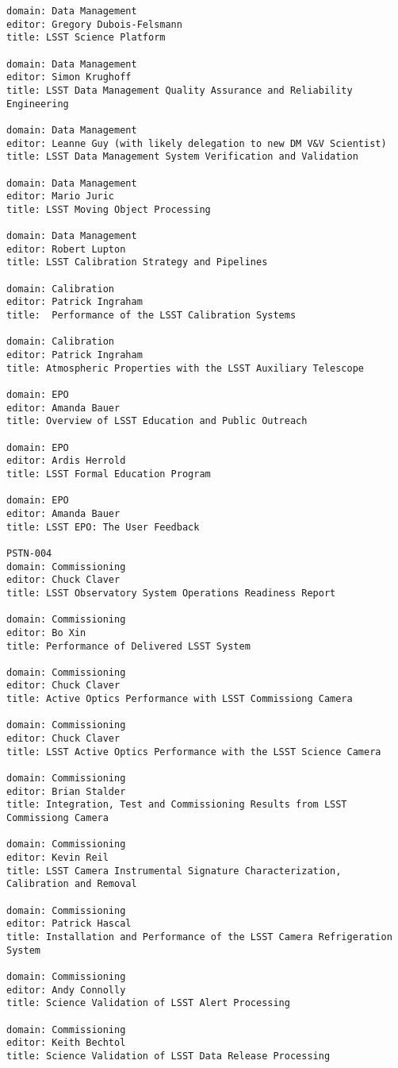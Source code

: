 \begin{verbatim}
domain: Data Management
editor: Gregory Dubois-Felsmann
title: LSST Science Platform

domain: Data Management
editor: Simon Krughoff
title: LSST Data Management Quality Assurance and Reliability Engineering

domain: Data Management
editor: Leanne Guy (with likely delegation to new DM V&V Scientist)
title: LSST Data Management System Verification and Validation

domain: Data Management
editor: Mario Juric
title: LSST Moving Object Processing

domain: Data Management
editor: Robert Lupton
title: LSST Calibration Strategy and Pipelines

domain: Calibration
editor: Patrick Ingraham
title:  Performance of the LSST Calibration Systems

domain: Calibration
editor: Patrick Ingraham
title: Atmospheric Properties with the LSST Auxiliary Telescope

domain: EPO
editor: Amanda Bauer
title: Overview of LSST Education and Public Outreach

domain: EPO
editor: Ardis Herrold
title: LSST Formal Education Program

domain: EPO
editor: Amanda Bauer
title: LSST EPO: The User Feedback

PSTN-004
domain: Commissioning
editor: Chuck Claver
title: LSST Observatory System Operations Readiness Report

domain: Commissioning
editor: Bo Xin
title: Performance of Delivered LSST System

domain: Commissioning
editor: Chuck Claver
title: Active Optics Performance with LSST Commissiong Camera

domain: Commissioning
editor: Chuck Claver
title: LSST Active Optics Performance with the LSST Science Camera

domain: Commissioning
editor: Brian Stalder
title: Integration, Test and Commissioning Results from LSST Commissiong Camera

domain: Commissioning
editor: Kevin Reil
title: LSST Camera Instrumental Signature Characterization, Calibration and Removal

domain: Commissioning
editor: Patrick Hascal
title: Installation and Performance of the LSST Camera Refrigeration System

domain: Commissioning
editor: Andy Connolly
title: Science Validation of LSST Alert Processing

domain: Commissioning
editor: Keith Bechtol
title: Science Validation of LSST Data Release Processing


\end{verbatim}
